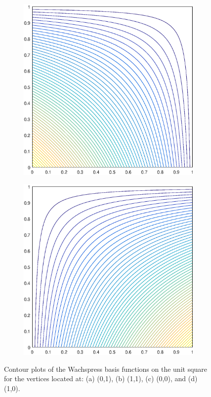 \begin{figure}
\begin{subfigure}[b]{0.35\textwidth}
		\caption{}
	\end{subfigure}
	\vfill
	\begin{subfigure}[b]{0.35\textwidth}
		\centering
		\includegraphics[width=\textwidth]{figures/sec_BF/square_WACHSPRESS1_contour_b1.eps}
		\caption{}
	\end{subfigure}
	\hspace{1cm}
	\begin{subfigure}[b]{0.35\textwidth}
		\centering
		\includegraphics[width=\textwidth]{figures/sec_BF/square_WACHSPRESS1_contour_b2.eps}
		\caption{}
	\end{subfigure}
\caption{Contour plots of the Wachspress basis functions on the unit square for the vertices located at: (a) (0,1), (b) (1,1), (c) (0,0), and (d) (1,0).}
\end{figure}

